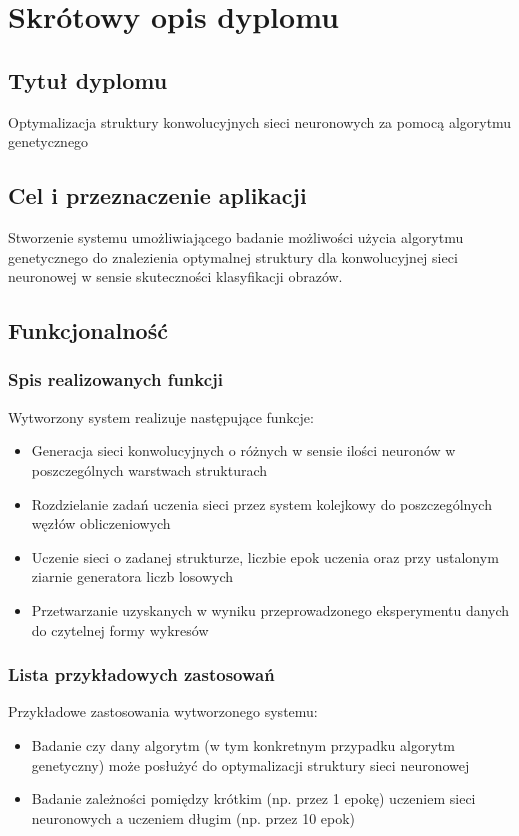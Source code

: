 \chapter[Dodatek A]{Skrótowy opis dyplomu}
\section{Tytuł dyplomu}
Optymalizacja struktury konwolucyjnych sieci neuronowych za
pomocą algorytmu genetycznego
\section{Cel i przeznaczenie aplikacji}
Stworzenie systemu umożliwiającego badanie możliwości użycia algorytmu genetycznego do znalezienia optymalnej struktury dla konwolucyjnej sieci neuronowej w sensie skuteczności klasyfikacji obrazów.
\section{Funkcjonalność}

\subsection{Spis realizowanych funkcji}
Wytworzony system realizuje następujące funkcje:
\begin{itemize}
  \item Generacja sieci konwolucyjnych o różnych w sensie ilości neuronów w poszczególnych warstwach strukturach
  \item Rozdzielanie zadań uczenia sieci przez system kolejkowy do poszczególnych węzłów obliczeniowych
  \item Uczenie sieci o zadanej strukturze, liczbie epok uczenia oraz przy ustalonym ziarnie generatora liczb losowych
  \item Przetwarzanie uzyskanych w wyniku przeprowadzonego eksperymentu danych do czytelnej formy wykresów
\end{itemize}
\subsection{Lista przykładowych zastosowań}
Przykładowe zastosowania wytworzonego systemu:
\begin{itemize}
  \item Badanie czy dany algorytm (w tym konkretnym przypadku algorytm genetyczny) może posłużyć do optymalizacji struktury sieci neuronowej
  \item Badanie zależności pomiędzy krótkim (np. przez 1 epokę) uczeniem sieci neuronowych a uczeniem długim (np. przez 10 epok)
\end{itemize}

